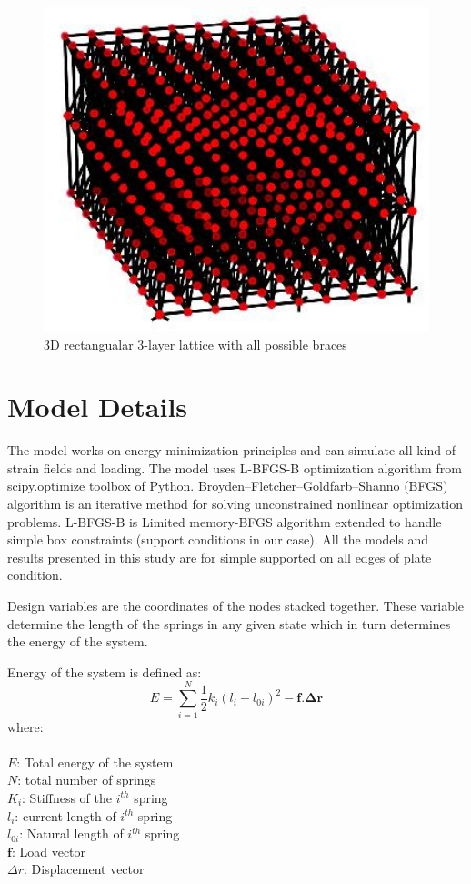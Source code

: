 \begin{figure}[!htbp]
\begin{minipage}{0.3\textwidth}
    \includegraphics[width = 1\textwidth]{Figures/10x12braced3d3layer.jpg}
    \caption{3D rectangualar 3-layer lattice with all possible braces}
    \label{fig:3d_rect3}
\end{minipage}
\end{figure}

\section{Model Details}
The model works on energy minimization principles and can simulate all kind of strain fields and loading. The model uses L-BFGS-B optimization algorithm from scipy.optimize toolbox of Python. Broyden–Fletcher–Goldfarb–Shanno (BFGS) algorithm is an iterative method for solving unconstrained nonlinear optimization problems. L-BFGS-B is Limited memory-BFGS algorithm extended to handle simple box constraints (support conditions in our case). All the models and results presented in this study are for simple supported on all edges of plate condition. 

Design variables are the coordinates of the nodes stacked together. These variable determine the length of the springs in any given state which in turn determines the energy of the system.

Energy of the system is defined as:
\begin{equation}
    E = \sum_{i = 1}^{N}\frac{1}{2}k_i (l_i - l_{0i})^2 - \boldsymbol{f.\Delta r}
\end{equation}
where:\\
\\
    $E$: Total energy of the system\\
    $N$: total number of springs\\
    $K_i$: Stiffness of the $i^{th}$ spring\\
    $l_i$: current length of $i^{th}$ spring\\
    $l_{0i}$: Natural length of $i^{th}$ spring\\
    $\boldsymbol{f}$: Load vector\\
    $\Delta r$: Displacement vector\\
    
